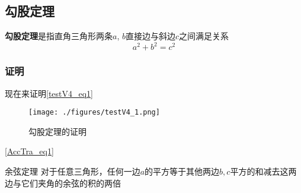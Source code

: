 
\subsection{勾股定理}
\textbf{勾股定理}是指直角三角形两条$a$, $b$直接边与斜边$c$之间满足关系
\begin{equation}\label{testV4_eq1}
a^2 + b^2 = c^2
\end{equation}

\subsubsection{证明}
现在来证明\autoref{testV4_eq1}

\begin{figure}[ht]
\centering
\texttt{[image: ./figures/testV4\_1.png]}
\caption{勾股定理的证明} \label{testV4_fig1}
\end{figure}
\autoref{AccTra_eq1}
\begin{theorem}{余弦定理}
对于任意三角形，任何一边$a$的平方等于其他两边$b, c$平方的和减去这两边与它们夹角的余弦的积的两倍
\end{theorem}